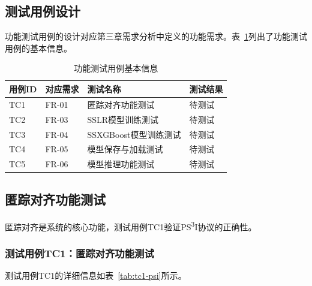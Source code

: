 \subsection{测试用例设计}

功能测试用例的设计对应第三章需求分析中定义的功能需求。表~\ref{tab:func-test-cases}列出了功能测试用例的基本信息。

\begin{table}[htbp]
    \centering
    \caption{功能测试用例基本信息}
    \label{tab:func-test-cases}
    \begin{tabular}{llll}
        \toprule
        \textbf{用例ID} & \textbf{对应需求} & \textbf{测试名称} & \textbf{测试结果} \\
        \midrule
        TC1 & FR-01 & 匿踪对齐功能测试 & 待测试 \\
        TC2 & FR-03 & SSLR模型训练测试 & 待测试 \\
        TC3 & FR-04 & SSXGBoost模型训练测试 & 待测试 \\
        TC4 & FR-05 & 模型保存与加载测试 & 待测试 \\
        TC5 & FR-06 & 模型推理功能测试 & 待测试 \\
        \bottomrule
    \end{tabular}
\end{table}

\subsection{匿踪对齐功能测试}

匿踪对齐是系统的核心功能，测试用例TC1验证PS\textsuperscript{3}I协议的正确性。

\subsubsection{测试用例TC1：匿踪对齐功能测试}

测试用例TC1的详细信息如表~\ref{tab:tc1-psi}所示。

